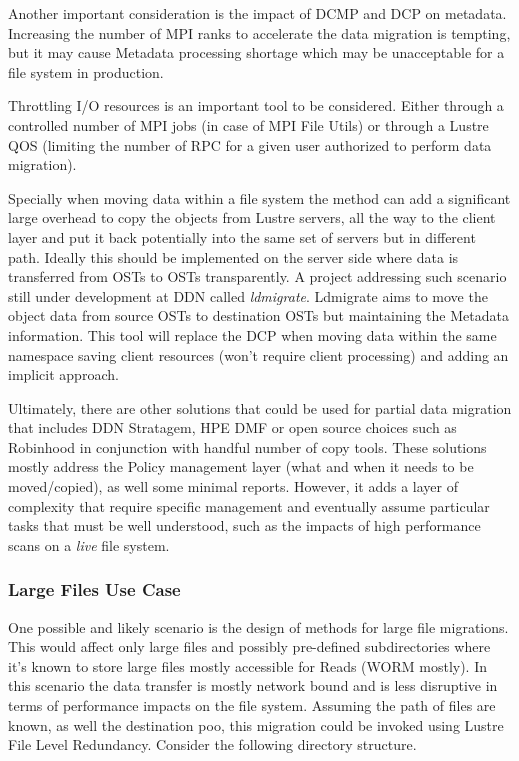 \documentclass{article}
\begin{document}
Another important consideration is the impact of DCMP and DCP on metadata. Increasing the number of MPI ranks to accelerate the data migration is tempting, but it may cause Metadata processing shortage which may be unacceptable for a file system in production.

Throttling I/O resources is an important tool to be considered. Either through a controlled number of MPI jobs (in case of MPI File Utils) or through a Lustre QOS (limiting the number of RPC for a given user authorized to perform data migration). 

Specially when moving data within a file system the method can add a significant large overhead to copy the objects from Lustre servers, all the way to the client layer and put it back potentially into the same set of servers but in different path. Ideally this should be implemented on the server side where data is transferred from OSTs to OSTs transparently. A project addressing such scenario still under development at DDN called \textit{ldmigrate}. Ldmigrate aims to move the object data from source OSTs to destination OSTs but maintaining the Metadata information. This tool will replace the DCP when moving data within the same namespace saving client resources (won't require client processing) and adding an implicit approach.

Ultimately, there are other solutions that could be used for partial data migration that includes DDN Stratagem, HPE DMF or open source choices such as Robinhood in conjunction with handful number of copy tools. These solutions mostly address the Policy management layer (what and when it needs to be moved/copied), as well some minimal reports. However, it adds a layer of complexity that require specific management and eventually assume particular tasks that must be well understood, such as the impacts of high performance scans on a \textit{live} file system. 

\subsubsection{Large Files Use Case}
One possible and likely scenario is the design of methods for large file migrations. This would affect only large files and possibly pre-defined subdirectories where it's known to store large files mostly accessible for Reads (WORM mostly). In this scenario the data transfer is mostly network bound  and is less disruptive in terms of performance impacts on the file system. Assuming the path of files are known, as well the destination poo, this migration could be invoked using Lustre File Level Redundancy. 
Consider the following directory structure.
\end{document}
